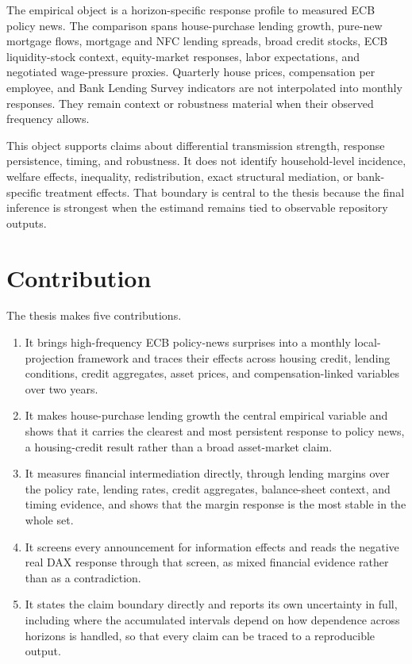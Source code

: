 The empirical object is a horizon-specific response profile to measured ECB policy news. The comparison spans house-purchase lending growth, pure-new mortgage flows, mortgage and NFC lending spreads, broad credit stocks, ECB liquidity-stock context, equity-market responses, labor expectations, and negotiated wage-pressure proxies. Quarterly house prices, compensation per employee, and Bank Lending Survey indicators are not interpolated into monthly responses. They remain context or robustness material when their observed frequency allows.

This object supports claims about differential transmission strength, response persistence, timing, and robustness. It does not identify household-level incidence, welfare effects, inequality, redistribution, exact structural mediation, or bank-specific treatment effects. That boundary is central to the thesis because the final inference is strongest when the estimand remains tied to observable repository outputs.

\section{Contribution}

The thesis makes five contributions.

\begin{enumerate}
  \item It brings high-frequency ECB policy-news surprises into a monthly local-projection framework and traces their effects across housing credit, lending conditions, credit aggregates, asset prices, and compensation-linked variables over two years.

  \item It makes house-purchase lending growth the central empirical variable and shows that it carries the clearest and most persistent response to policy news, a housing-credit result rather than a broad asset-market claim.

  \item It measures financial intermediation directly, through lending margins over the policy rate, lending rates, credit aggregates, balance-sheet context, and timing evidence, and shows that the margin response is the most stable in the whole set.

  \item It screens every announcement for information effects and reads the negative real DAX response through that screen, as mixed financial evidence rather than as a contradiction.

  \item It states the claim boundary directly and reports its own uncertainty in full, including where the accumulated intervals depend on how dependence across horizons is handled, so that every claim can be traced to a reproducible output.
\end{enumerate}
